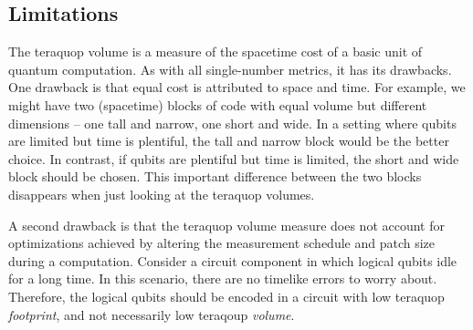 \subsection{Limitations}\label{subsec:teraquop-limitations}

The teraquop volume is a measure of the spacetime cost of a basic unit of quantum computation.
As with all single-number metrics, it has its drawbacks.
One drawback is that equal cost is attributed to space and time.
For example, we might have two (spacetime) blocks of code with equal volume but different dimensions -- one tall and narrow, one short and wide.
In a setting where qubits are limited but time is plentiful, the tall and narrow block would be the better choice.
In contrast, if qubits are plentiful but time is limited, the short and wide block should be chosen.
This important difference between the two blocks disappears when just looking at the teraquop volumes.

A second drawback is that the teraquop volume measure does not account for optimizations achieved by altering the measurement schedule and patch size during a computation.
Consider a circuit component in which logical qubits idle for a long time.
In this scenario, there are no timelike errors to worry about.
Therefore, the logical qubits should be encoded in a circuit with low teraquop \emph{footprint}, and not necessarily low teraqoup \emph{volume}.
